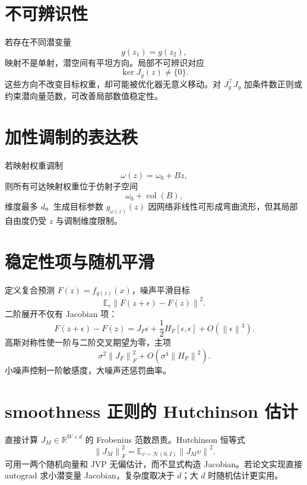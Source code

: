 \documentclass[UTF8,12pt,a4paper,fontset=none]{ctexart}
\numberwithin{equation}{section}
\newcommand{\R}{\mathbb{R}}
\newcommand{\E}{\mathbb{E}}
\newcommand{\norm}[1]{\left\lVert #1\right\rVert}
\begin{document}
\section{不可辨识性}
若存在不同潜变量
\begin{equation}
 g(z_1)=g(z_2),
\end{equation}
映射不是单射，潜空间有平坦方向。局部不可辨识对应
\begin{equation}
 \ker J_g(z)\ne\{0\}.
\end{equation}
这些方向不改变目标权重，却可能被优化器无意义移动。对 $J_g^\top J_g$ 加条件数正则或约束潜向量范数，可改善局部数值稳定性。

\section{加性调制的表达秩}
若映射权重调制
\begin{equation}
 \omega(z)=\omega_0+Bz,
\end{equation}
则所有可达映射权重位于仿射子空间
\begin{equation}
 \omega_0+\operatorname{col}(B),
\end{equation}
维度最多 $d$。生成目标参数 $g_{\omega(z)}(z)$ 因网络非线性可形成弯曲流形，但其局部自由度仍受 $z$ 与调制维度限制。

\section{稳定性项与随机平滑}
定义复合预测 $F(z)=f_{g(z)}(x)$，噪声平滑目标
\begin{equation}
 \E_\epsilon\norm{F(z+\epsilon)-F(z)}^2.
\end{equation}
二阶展开不仅有 Jacobian 项：
\begin{equation}
 F(z+\epsilon)-F(z)
 =J_F\epsilon+\frac12H_F[\epsilon,\epsilon]+O(\norm\epsilon^3).
\end{equation}
高斯对称性使一阶与二阶交叉期望为零，主项
\begin{equation}
 \sigma^2\norm{J_F}_F^2+O(\sigma^4\norm{H_F}^2).
\end{equation}
小噪声控制一阶敏感度，大噪声还惩罚曲率。

\section{smoothness 正则的 Hutchinson 估计}
直接计算 $J_M\in\R^{W\times d}$ 的 Frobenius 范数昂贵。Hutchinson 恒等式
\begin{equation}
 \norm{J_M}_F^2
 =\E_{v\sim\mathcal N(0,I)}\norm{J_Mv}^2.
\end{equation}
可用一两个随机向量和 JVP 无偏估计，而不显式构造 Jacobian。若论文实现直接 autograd 求小潜变量 Jacobian，复杂度取决于 $d$；大 $d$ 时随机估计更实用。
\end{document}
